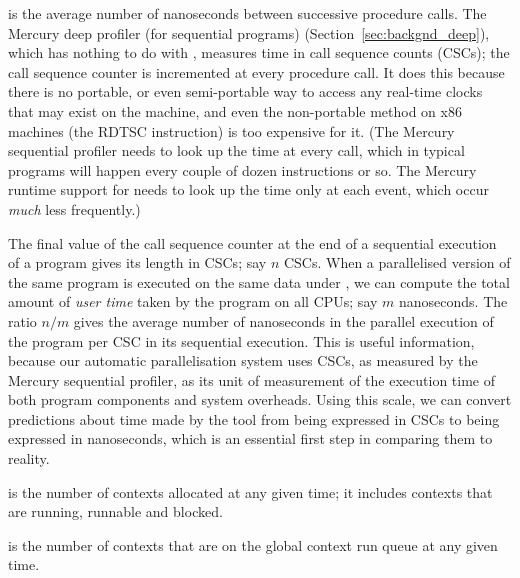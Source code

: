 is the average number of nanoseconds between successive procedure calls.
The Mercury deep profiler (for sequential programs) \citep{conway:2001:mercury-deep}
(Section~\ref{sec:backgnd_deep}),
which has nothing to do with \tscope,
measures time in call sequence counts (CSCs);
the call sequence counter is incremented at every procedure call.
It does this because there is no portable, or even semi-portable way
to access any real-time clocks that may exist on the machine,
and even the non-portable method on x86 machines (the RDTSC instruction)
is too expensive for it.
(The Mercury sequential profiler needs to look up the time at every call,
which in typical programs will happen every couple of dozen instructions or so.
The Mercury runtime support for \tscope needs to look up the time only at
each event,
which occur \emph{much} less frequently.)

The final value of the call sequence counter
at the end of a sequential execution of a program
gives its length in CSCs; say $n$ CSCs.
When a parallelised version of the same program is executed on the same data
under \tscope,
we can compute the total amount of \emph{user time}
taken by the program on all CPUs; say $m$ nanoseconds.
The ratio $n/m$ gives the average number of nanoseconds
in the parallel execution of the program
per CSC in its sequential execution.
This is useful information,
because our automatic parallelisation system
uses CSCs, as measured by the Mercury sequential profiler,
as its unit of measurement of the execution time
of both program components and system overheads.
Using this scale, we can convert predictions about time made by the tool
from being expressed in CSCs to being expressed in nanoseconds,
which is an essential first step in comparing them to reality.

 is the number of contexts allocated at any given
time;
it includes contexts that are running, runnable and blocked.

 is the number of contexts that are on the global
context run queue at any given time.

